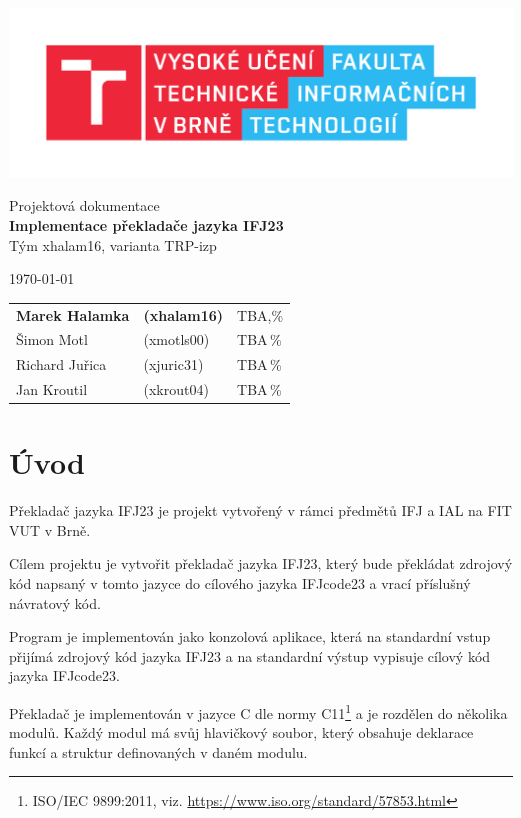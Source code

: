 \documentclass[a4paper, 11pt]{article}
\begin{document}
\begin{titlepage}
		\begin{center}
			\includegraphics[width=0.77\linewidth]{include/FIT_logo.pdf} \\


			\Huge{Projektová dokumentace} \\
			\LARGE{\textbf{Implementace překladače jazyka IFJ23}} \\
			\Large{Tým xhalam16, varianta TRP-izp}
		\end{center}

		\begin{minipage}{0.4 \textwidth}
			{\Large \today}
		\end{minipage}
		\hfill
		\begin{minipage}[r]{0.6 \textwidth}
			\Large
			\begin{tabular}{l l l}
				\textbf{Marek Halamka} & \textbf{(xhalam16)} & \quad TBA,\% \\
				Šimon Motl & (xmotls00) & \quad TBA\,\% \\
				Richard Juřica & (xjuric31) & \quad TBA\,\% \\
				Jan Kroutil & (xkrout04) & \quad TBA\,\% \\
			\end{tabular}
		\end{minipage}
	\end{titlepage}

	\tableofcontents

	\newpage
	\section{Úvod}
	Překladač jazyka IFJ23 je projekt vytvořený v rámci předmětů IFJ a IAL na FIT VUT v Brně. 
	\par\noindent Cílem projektu je vytvořit překladač jazyka IFJ23, který bude překládat zdrojový kód napsaný v tomto jazyce do cílového jazyka IFJcode23 a vrací příslušný návratový kód.
	\par\noindent Program je implementován jako konzolová aplikace, která na standardní vstup přijímá zdrojový kód jazyka IFJ23 a na standardní výstup vypisuje cílový kód jazyka IFJcode23. 
	\par\noindent Překladač je implementován v jazyce C dle normy C11\footnote{ISO/IEC 9899:2011, viz. \url{https://www.iso.org/standard/57853.html}} a je rozdělen do několika modulů. Každý modul má svůj hlavičkový soubor, který obsahuje deklarace funkcí a struktur definovaných v daném modulu. 
\end{document}
